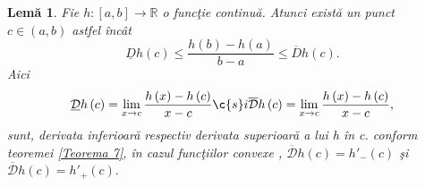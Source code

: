 \documentclass[a4paper,12pt,oneside]{report}
\newtheorem{lemma}{Lem\u{a}}
\begin{document}
\begin{lemma} \label{Lema 3} 
Fie \(h : \left [ a,b\right ]\rightarrow \mathbb{R}\) o func\c{t}ie continu\u{a}. Atunci exist\u{a} un punct \(c \in \left ( a,b \right )\) astfel \^{i}nc\^{a}t 
\begin{displaymath}
   \underline{D}h\left ( c \right ) \leq  \frac{h\left ( b \right ) - h\left ( a \right )}{b-a}\leq \overline{D}h\left ( c \right ).
\end{displaymath}
Aici 
\begin{displaymath}
   \underline{\mathcal{D}}h\left ( c \right ) = \lim_{x\rightarrow c}  \frac{h\left ( x \right ) - h\left ( c \right )}{x-c} \c{s}i \overline{\mathcal{D}}h\left ( c \right ) = \lim_{x\rightarrow c}  \frac{h\left ( x \right ) - h\left ( c \right )}{x-c}, 
\end{displaymath}
sunt, derivata inferioar\u{a} respectiv derivata superioar\u{a} a lui h \^{i}n c. conform teoremei \ref{Teorema 7}, \^{i}n cazul func\c{t}iilor convexe , \(\overline{\mathcal{D}}h\left ( c \right ) = {h}'_{-}\left ( c \right )\)  \c{s}i   \(\overline{\mathcal{D}}h\left ( c \right )  = {h}'_{+}\left ( c \right ).\) 
\end{lemma}
\end{document}
